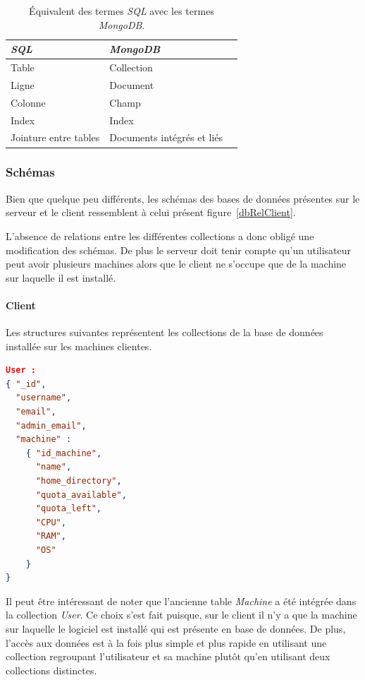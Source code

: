 \documentclass[a4paper,10pt, twoside]{report}
\begin{document}
\begin{spacing}{1.2}
\begin{table}[h!]
  \centering
  \def\arraystretch{1.5}
  \setlength{\fboxsep}{13pt} %
  \setlength{\fboxrule}{0pt} %
  \begin{tabular}{lm{6cm}m{6cm}}
   \rowcolor{arkred} 
    \arrayrulecolor{gray73}\hline
    \color{white} \textbf{\textit{SQL}} &
    \color{white} \textbf{\textit{MongoDB}}\\
    \hline
    Table & Collection\\
    \hline
    Ligne & Document\\
    \hline
    Colonne & Champ\\
    \hline
    Index & Index\\
    \hline
    Jointure entre tables & Documents intégrés et liés
  \end{tabular}
  \caption{\label{tabMappSQLMongoTerms} Équivalent des termes \textit{SQL}
  avec les termes \textit{MongoDB}.}
\end{table}

\subsubsection{Schémas}

Bien que quelque peu différents, les schémas des bases de données
présentes sur le serveur et le client ressemblent à celui présent
figure~\ref{dbRelClient}.

L'absence de relations entre les différentes collections a donc obligé une
modification des schémas. De plus le serveur doit tenir compte qu'un
utilisateur peut avoir plusieurs machines alors que le client ne s'occupe que
de la machine sur laquelle il est installé.

\paragraph{Client}

\bigskip

Les structures suivantes représentent les collections de la base de données
installée sur les machines clientes.

\begin{lstlisting}[language=json]
User :
{ "_id",
  "username",
  "email",
  "admin_email",
  "machine" :
    { "id_machine",
      "name",
      "home_directory",
      "quota_available",
      "quota_left",
      "CPU",
      "RAM",
      "OS"
    }
}
\end{lstlisting}

Il peut être intéressant de noter que l'ancienne table \textit{Machine} a été
intégrée dans la collection \textit{User}. Ce choix s'est fait puisque, sur
le client il n'y a que la machine sur laquelle le logiciel est installé qui est
présente en base de données. De plus, l'accès aux données est à la
fois plus simple et plus rapide en utilisant une collection regroupant
l'utilisateur et sa machine plutôt qu'en utilisant deux collections
distinctes.


\end{spacing}
\end{document}
